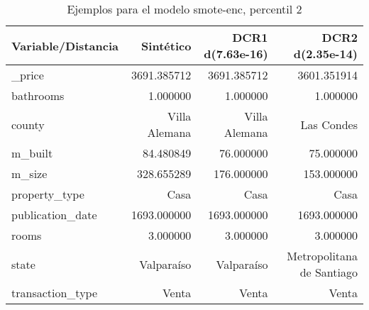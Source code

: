 \begin{table}[H]
\centering
\fontsize{10}{14}\selectfont
\caption{Ejemplos para el modelo smote-enc, percentil 2}
\label{table-example-economicos-b-2-smote-enc-2p}
\begin{tabular}{|l|r|r|r|}
\hline
\rowcolor[gray]{0.8}
Variable/Distancia & Sintético & DCR1 d(7.63e-16) & DCR2 d(2.35e-14) \\
\hline \_price & \cellcolor[rgb]{0.9, 0.54, 0.52} 3691.385712 & \cellcolor[rgb]{0.9, 0.54, 0.52} 3691.385712 & 3601.351914 \\
\hline bathrooms & \cellcolor[rgb]{0.9, 0.54, 0.52} 1.000000 & \cellcolor[rgb]{0.9, 0.54, 0.52} 1.000000 & \cellcolor[rgb]{0.9, 0.54, 0.52} 1.000000 \\
\hline county & \cellcolor[rgb]{0.9, 0.54, 0.52} Villa Alemana & \cellcolor[rgb]{0.9, 0.54, 0.52} Villa Alemana & Las Condes \\
\hline m\_built & \cellcolor[rgb]{0.9, 0.54, 0.52} 84.480849 & 76.000000 & 75.000000 \\
\hline m\_size & \cellcolor[rgb]{0.9, 0.54, 0.52} 328.655289 & 176.000000 & 153.000000 \\
\hline property\_type & \cellcolor[rgb]{0.9, 0.54, 0.52} Casa & \cellcolor[rgb]{0.9, 0.54, 0.52} Casa & \cellcolor[rgb]{0.9, 0.54, 0.52} Casa \\
\hline publication\_date & \cellcolor[rgb]{0.9, 0.54, 0.52} 1693.000000 & \cellcolor[rgb]{0.9, 0.54, 0.52} 1693.000000 & \cellcolor[rgb]{0.9, 0.54, 0.52} 1693.000000 \\
\hline rooms & \cellcolor[rgb]{0.9, 0.54, 0.52} 3.000000 & \cellcolor[rgb]{0.9, 0.54, 0.52} 3.000000 & \cellcolor[rgb]{0.9, 0.54, 0.52} 3.000000 \\
\hline state & \cellcolor[rgb]{0.9, 0.54, 0.52} Valparaíso & \cellcolor[rgb]{0.9, 0.54, 0.52} Valparaíso & Metropolitana de Santiago \\
\hline transaction\_type & \cellcolor[rgb]{0.9, 0.54, 0.52} Venta & \cellcolor[rgb]{0.9, 0.54, 0.52} Venta & \cellcolor[rgb]{0.9, 0.54, 0.52} Venta \\
\hline
\end{tabular}
\end{table}
